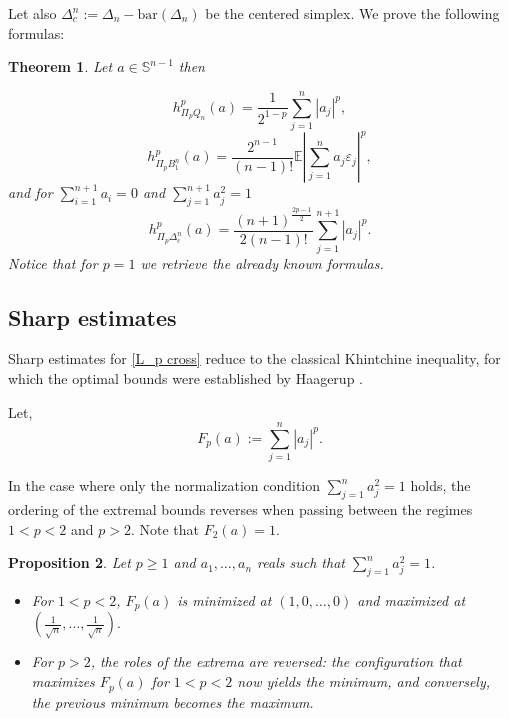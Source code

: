 \documentclass[10pt]{amsart}
\newcommand{\gr}{\geqslant}
\newcommand{\E}{\mathbb{E}}
\newcommand{\1}{\textbf{1}}
\numberwithin{equation}{section} %
\newtheorem{theorem}{Theorem}[section] %
\newtheorem{proposition}[theorem]{Proposition}
\theoremstyle{remark}
\theoremstyle{definition}
\begin{document}
Let also $\Delta_c^n:=\Delta_n-\text{bar}(\Delta_n)$ be the centered simplex. We prove the following formulas:
\begin{theorem}\label{Formulas for L_p proj}
Let $a \in \mathbb{S}^{n-1}$ then

\begin{equation}\label{L_p cube}
    h^{p}_{\Pi_pQ_n}(a)=\frac{1}{2^{1-p}}\sum_{j=1}^{n}|a_j|^p,
\end{equation}
\begin{equation}\label{L_p cross}
    h_{\Pi_p B_1^n}^p(a)=\frac{2^{n-1}}{(n-1)!} \E \left|\sum_{j=1}^na_j \varepsilon_j \right|^p,
\end{equation}
and for $\sum_{i=1}^{n+1}a_i=0$ and $\sum_{j=1}^{n+1}a_j^2=1$
\begin{equation}\label{L_p simp}
   h_{\Pi_p \Delta_c^n}^p(a)=\frac{(n+1)^{\frac{2p-1}{2}}}{2(n-1)!}\sum_{j=1}^{n+1}|a_j|^p.
\end{equation}
Notice that for $p=1$ we retrieve the already known formulas.
\end{theorem}


\subsection{Sharp estimates}
Sharp estimates for \eqref{L_p cross} reduce to the classical Khintchine inequality, for which the optimal bounds were established by Haagerup \cite{haagerup1981best}.

Let,
\[
F_p(a) := \sum_{j=1}^{n} |a_j|^p.
\]

In the case where only the normalization condition  $\sum_{j=1}^na_j^2=1$ holds, the ordering of the extremal bounds reverses when passing between the regimes $1<p<2$ and $p>2$. Note that $F_2(a)=1$.
\begin{proposition}\label{bounds unc}
 Let $p\gr1$ and  $a_1,\ldots,a_{n}$ reals such that $\sum_{j=1}^{n}a_j^2=1$.  
\begin{itemize}
    \item For $1< p<2$, $F_p(a)$ is minimized at $(1,0,\ldots,0)$ and maximized at $\left( \frac{1}{\sqrt{n}},\ldots,\frac{1}{\sqrt{n}}\right).$

    \item For $p>2$,  the roles of the extrema are reversed: 
the configuration that maximizes $F_p(a)$ for $1 < p < 2$ now yields the minimum, 
and conversely, the previous minimum becomes the maximum.
    \end{itemize}
\end{proposition}
\end{document}
